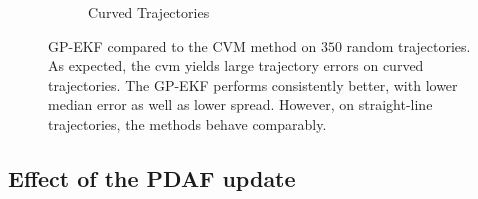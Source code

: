\begin{figure}
{\begin{subfigure}{0.65\textwidth}
            \caption{Curved Trajectories}
        \end{subfigure}
    }
    \caption{GP-EKF compared to the CVM method on $350$ random trajectories. As expected, the \acrshort{cvm} yields large trajectory errors on curved trajectories. The GP-EKF performs consistently better, with lower median error as well as lower spread. However, on straight-line trajectories, the methods behave comparably.}
    \label{fig:stats_direct_gp_vs_ekf_cvm}
\end{figure}

\subsection{Effect of the PDAF update}
\begin{figure}[h]
    \centering
\end{figure}
